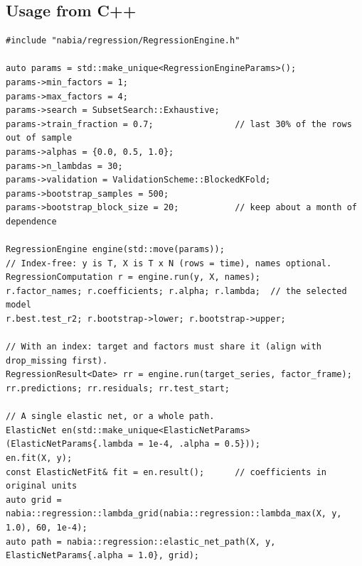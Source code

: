 \documentclass[11pt,a4paper]{article}
\begin{document}
\subsection{Usage from C++}
\begin{lstlisting}
#include "nabia/regression/RegressionEngine.h"

auto params = std::make_unique<RegressionEngineParams>();
params->min_factors = 1;
params->max_factors = 4;
params->search = SubsetSearch::Exhaustive;
params->train_fraction = 0.7;                // last 30% of the rows out of sample
params->alphas = {0.0, 0.5, 1.0};
params->n_lambdas = 30;
params->validation = ValidationScheme::BlockedKFold;
params->bootstrap_samples = 500;
params->bootstrap_block_size = 20;           // keep about a month of dependence

RegressionEngine engine(std::move(params));
// Index-free: y is T, X is T x N (rows = time), names optional.
RegressionComputation r = engine.run(y, X, names);
r.factor_names; r.coefficients; r.alpha; r.lambda;  // the selected model
r.best.test_r2; r.bootstrap->lower; r.bootstrap->upper;

// With an index: target and factors must share it (align with drop_missing first).
RegressionResult<Date> rr = engine.run(target_series, factor_frame);
rr.predictions; rr.residuals; rr.test_start;

// A single elastic net, or a whole path.
ElasticNet en(std::make_unique<ElasticNetParams>(ElasticNetParams{.lambda = 1e-4, .alpha = 0.5}));
en.fit(X, y);
const ElasticNetFit& fit = en.result();      // coefficients in original units
auto grid = nabia::regression::lambda_grid(nabia::regression::lambda_max(X, y, 1.0), 60, 1e-4);
auto path = nabia::regression::elastic_net_path(X, y, ElasticNetParams{.alpha = 1.0}, grid);
\end{lstlisting}
\end{document}
